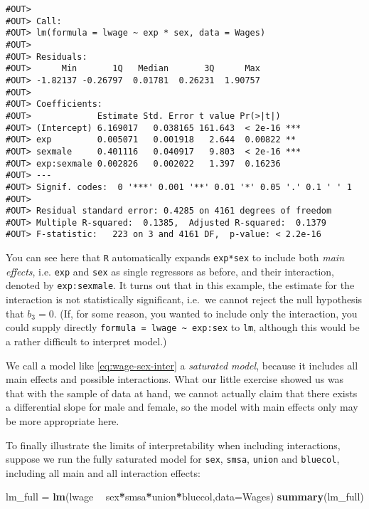 \documentclass[]{book}
\newenvironment{Shaded}{\begin{snugshade}}{\end{snugshade}}
\newcommand{\KeywordTok}[1]{\textcolor[rgb]{0.13,0.29,0.53}{\textbf{#1}}}
\newcommand{\DataTypeTok}[1]{\textcolor[rgb]{0.13,0.29,0.53}{#1}}
\newcommand{\StringTok}[1]{\textcolor[rgb]{0.31,0.60,0.02}{#1}}
\newcommand{\OperatorTok}[1]{\textcolor[rgb]{0.81,0.36,0.00}{\textbf{#1}}}
\newcommand{\NormalTok}[1]{#1}
\begin{document}
\begin{verbatim}
#OUT> 
#OUT> Call:
#OUT> lm(formula = lwage ~ exp * sex, data = Wages)
#OUT> 
#OUT> Residuals:
#OUT>      Min       1Q   Median       3Q      Max 
#OUT> -1.82137 -0.26797  0.01781  0.26231  1.90757 
#OUT> 
#OUT> Coefficients:
#OUT>             Estimate Std. Error t value Pr(>|t|)    
#OUT> (Intercept) 6.169017   0.038165 161.643  < 2e-16 ***
#OUT> exp         0.005071   0.001918   2.644  0.00822 ** 
#OUT> sexmale     0.401116   0.040917   9.803  < 2e-16 ***
#OUT> exp:sexmale 0.002826   0.002022   1.397  0.16236    
#OUT> ---
#OUT> Signif. codes:  0 '***' 0.001 '**' 0.01 '*' 0.05 '.' 0.1 ' ' 1
#OUT> 
#OUT> Residual standard error: 0.4285 on 4161 degrees of freedom
#OUT> Multiple R-squared:  0.1385,  Adjusted R-squared:  0.1379 
#OUT> F-statistic:   223 on 3 and 4161 DF,  p-value: < 2.2e-16
\end{verbatim}

You can see here that \texttt{R} automatically expands \texttt{exp*sex}
to include both \emph{main effects}, i.e. \texttt{exp} and \texttt{sex}
as single regressors as before, and their interaction, denoted by
\texttt{exp:sexmale}. It turns out that in this example, the estimate
for the interaction is not statistically significant, i.e.~we cannot
reject the null hypothesis that \(b_3 = 0\). (If, for some reason, you
wanted to include only the interaction, you could supply directly
\texttt{formula\ =\ lwage\ \textasciitilde{}\ exp:sex} to \texttt{lm},
although this would be a rather difficult to interpret model.)

We call a model like \eqref{eq:wage-sex-inter} a \emph{saturated model},
because it includes all main effects and possible interactions. What our
little exercise showed us was that with the sample of data at hand, we
cannot actually claim that there exists a differential slope for male
and female, so the model with main effects only may be more appropriate
here.

To finally illustrate the limits of interpretability when including
interactions, suppose we run the fully saturated model for \texttt{sex},
\texttt{smsa}, \texttt{union} and \texttt{bluecol}, including all main
and all interaction effects:

\begin{Shaded}
\begin{Highlighting}[]
\NormalTok{lm_full =}\StringTok{ }\KeywordTok{lm}\NormalTok{(lwage }\OperatorTok{~}\StringTok{ }\NormalTok{sex}\OperatorTok{*}\NormalTok{smsa}\OperatorTok{*}\NormalTok{union}\OperatorTok{*}\NormalTok{bluecol,}\DataTypeTok{data=}\NormalTok{Wages)}
\KeywordTok{summary}\NormalTok{(lm_full)}
\end{Highlighting}
\end{Shaded}
\end{document}
